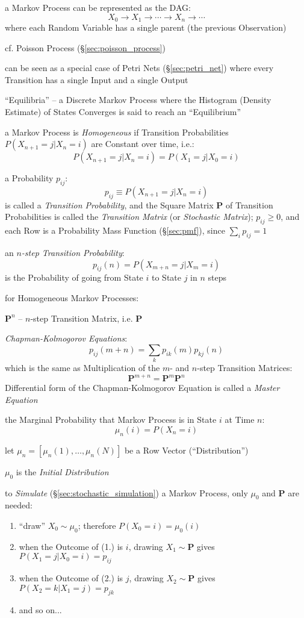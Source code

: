 a Markov Process can be represented as the DAG:
\[
  X_0 \longrightarrow X_1 \longrightarrow \cdots \longrightarrow X_n
    \longrightarrow \cdots
\]
where each Random Variable has a single parent (the previous Observation)

cf. Poisson Process (\S\ref{sec:poisson_process})

\fist can be seen as a special case of Petri Nets (\S\ref{sec:petri_net}) where
every Transition has a single Input and a single Output

``Equilibria'' -- a Discrete Markov Process where the Histogram (Density
Estimate) of States Converges is said to reach an ``Equilibrium''

a Markov Process is \emph{Homogeneous} if Transition Probabilities
$P(X_{n+1} = j | X_n = i)$ are Constant over time, i.e.:
\[
  P(X_{n+1} = j | X_n = i) = P(X_1 = j| X_0 = i)
\]

a Probability $p_{ij}$:
\[
  p_{ij} \equiv P(X_{n+1} = j | X_n = i)
\]
is called a \emph{Transition Probability}, and the Square Matrix $\mathbf{P}$ of
Transition Probabilities is called the \emph{Transition Matrix} (or
\emph{Stochastic Matrix});
$p_{ij} \geq 0$, and each Row is a Probability Mass Function (\S\ref{sec:pmf}),
since $\sum_i p_{ij} = 1$

an \emph{$n$-step Transition Probability}:
\[
  p_{ij}(n) = P(X_{m+n} = j | X_m = i)
\]
is the Probability of going from State $i$ to State $j$ in $n$ steps

for Homogeneous Markov Processes:

$\mathbf{P}^n$ -- $n$-step Transition Matrix, i.e. $\mathbf{P}$

\emph{Chapman-Kolmogorov Equations}:
\[
  p_{ij}(m + n) = \sum_k p_{ik}(m) p_{kj}(n)
\]
which is the same as Multiplication of the $m$- and $n$-step Transition
Matrices:
\[
  \mathbf{P}^{m+n} = \mathbf{P}^m \mathbf{P}^n
\]
Differential form of the Chapman-Kolmogorov Equation is called a
\emph{Master Equation}

the Marginal Probability that Markov Process is in State $i$ at Time $n$:
\[
  \mu_n(i) = P(X_n = i)
\]

let $\mu_n = [\mu_n(1), \ldots, \mu_n(N)]$ be a Row Vector (``Distribution'')

$\mu_0$ is the \emph{Initial Distribution}

to \emph{Simulate} (\S\ref{sec:stochastic_simulation}) a Markov Process, only
$\mu_0$ and $\mathbf{P}$ are needed:
\begin{enumerate}
  \item ``draw'' $X_0 \sim \mu_0$; therefore $P(X_0 = i) = \mu_0(i)$
  \item when the Outcome of (1.) is $i$, drawing $X_1 \sim \mathbf{P}$ gives
    $P(X_1 = j | X_0 = i) = p_{ij}$
  \item when the Outcome of (2.) is $j$, drawing $X_2 \sim \mathbf{P}$ gives
    $P(X_2 = k | X_1 = j) = p_{jk}$
  \item and so on...
\end{enumerate}

